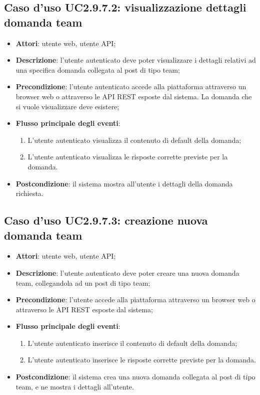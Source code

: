 \hypertarget{UC2.9.7.2}{}
\subsection{Caso d'uso UC2.9.7.2: visualizzazione dettagli domanda team}
\begin{itemize}
\item \textbf{Attori}: utente web, utente API;
\item \textbf{Descrizione}: l'utente autenticato deve poter visualizzare i dettagli relativi ad una specifica domanda collegata al post di tipo team; 
      \item \textbf{Precondizione}: l'utente autenticato accede alla piattaforma attraverso un browser web o attraverso le API REST esposte dal sistema. La domanda che si vuole visualizzare deve esistere;

        \item \textbf{Flusso principale degli eventi}:
          \begin{enumerate}
          \item L'utente autenticato visualizza il contenuto di default della domanda;
          \item L'utente autenticato visualizza le risposte corrette previste per la domanda.

      \end{enumerate}
    \item \textbf{Postcondizione}: il sistema mostra all'utente i dettagli della domanda richiesta.
  \end{itemize}
\hypertarget{UC2.9.7.3}{}
\subsection{Caso d'uso UC2.9.7.3: creazione nuova domanda team}
\begin{itemize}
\item \textbf{Attori}: utente web, utente API;
\item \textbf{Descrizione}: l'utente autenticato deve poter creare una nuova domanda team, collegandola ad un post di tipo team; 
      \item \textbf{Precondizione}: l'utente accede alla piattaforma attraverso un browser web o attraverso le API REST esposte dal sistema;

        \item \textbf{Flusso principale degli eventi}:
          \begin{enumerate}
          \item L'utente autenticato inserisce il contenuto di default della domanda;
          \item L'utente autenticato inserisce le risposte corrette previste per la domanda.

      \end{enumerate}
    \item \textbf{Postcondizione}: il sistema crea una nuova domanda collegata al post di tipo team, e ne mostra i dettagli all'utente.
  \end{itemize}
\hypertarget{UC2.9.7.4}{}
